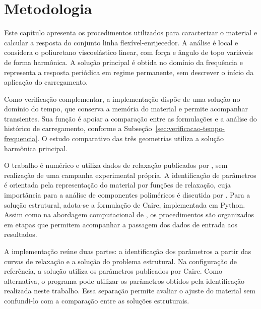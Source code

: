 \documentclass[arial,centeredequations,english,brazilian,oneside,section=TITLE]{ifes8}
\begin{document}
\chapter{Metodologia}
\label{sec:metodologia}

Este capítulo apresenta os procedimentos utilizados para caracterizar o material e calcular a
resposta do conjunto linha flexível-enrijecedor. A análise é local e considera o poliuretano
viscoelástico linear, com força e ângulo de topo variáveis de forma harmônica. A solução principal
é obtida no domínio da frequência e representa a resposta periódica em regime permanente,
sem descrever o início da aplicação do carregamento.

Como verificação complementar, a implementação dispõe de uma solução no domínio
do tempo, que conserva a memória do material e permite acompanhar transientes.
Sua função é apoiar a comparação entre as formulações e a análise do histórico
de carregamento, conforme a Subseção~\ref{sec:verificacao-tempo-frequencia}.
O estudo comparativo das três geometrias utiliza a solução harmônica principal.

O trabalho é numérico e utiliza dados de relaxação publicados por ,
sem realização de uma campanha experimental própria. A identificação de parâmetros é orientada
pela representação do material por funções de relaxação, cuja importância para a análise de
componentes poliméricos é discutida por . Para a solução estrutural,
adota-se a formulação de Caire, implementada em Python. Assim como na abordagem computacional
de , os procedimentos são organizados em etapas que permitem acompanhar
a passagem dos dados de entrada aos resultados.

A implementação reúne duas partes: a identificação dos parâmetros a partir das curvas de
relaxação e a solução do problema estrutural. Na configuração de referência, a solução utiliza
os parâmetros publicados por Caire. Como alternativa, o programa pode utilizar os parâmetros
obtidos pela identificação realizada neste trabalho. Essa separação permite avaliar o ajuste
do material sem confundi-lo com a comparação entre as soluções estruturais.
\end{document}
